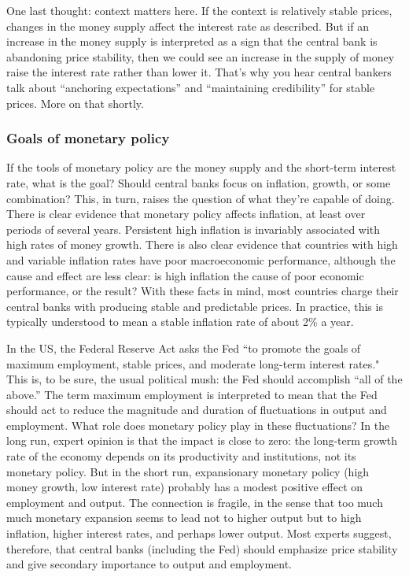 \documentclass[letterpaper,12pt]{article}
\begin{document}
One last thought:  context matters here.
If the context is relatively stable prices, changes in the
money supply affect the interest rate as described.
But if an increase in the money supply is interpreted as a sign
that the central bank is abandoning price stability,
then we could see an increase in the supply of money
raise the interest rate rather than lower it.
That's why you hear central bankers talk about ``anchoring expectations''
and ``maintaining credibility'' for stable prices.
More on that shortly.

\subsubsection*{Goals of monetary policy}

If the tools of monetary policy are the money supply and the short-term
interest rate, what is the goal?
Should central banks focus
on inflation, growth, or some combination?
This, in turn, raises the question of what they're capable of doing.
There is clear evidence that monetary policy affects inflation,
at least over periods of several years.
Persistent high inflation is invariably associated with
high rates of money growth.
There is also clear evidence that
countries with high and variable inflation rates have poor
macroeconomic performance,
although the cause and effect are less clear:
is high inflation the cause of poor economic performance,
or the result?
With these facts in mind, most countries charge their central
banks with producing stable and predictable prices. In practice,
this is typically understood to mean a stable inflation rate of
about 2\% a year.

In the US, the Federal Reserve Act asks the Fed ``to promote the
goals of maximum employment, stable prices, and moderate long-term
interest rates."
This is, to be sure, the usual political mush:  the Fed should
accomplish ``all of the above.''
The term maximum employment is interpreted to mean
that the Fed should act to reduce the magnitude and duration of
fluctuations in output and employment.
What role does monetary policy play in these fluctuations?
In the long run, expert opinion is that the impact is close to zero:
the long-term growth rate of the economy depends on its productivity and institutions, not its monetary policy.
But in the short run, expansionary monetary policy
(high money growth, low interest rate)
probably has a modest positive effect on
employment and output.
The connection is fragile, in the sense that too much
much monetary expansion seems to lead not to higher
output but to high inflation, higher interest rates,
and perhaps lower output.
Most experts suggest, therefore,
that central banks (including the Fed) should emphasize
price stability and give secondary importance to output and
employment.
\end{document}
